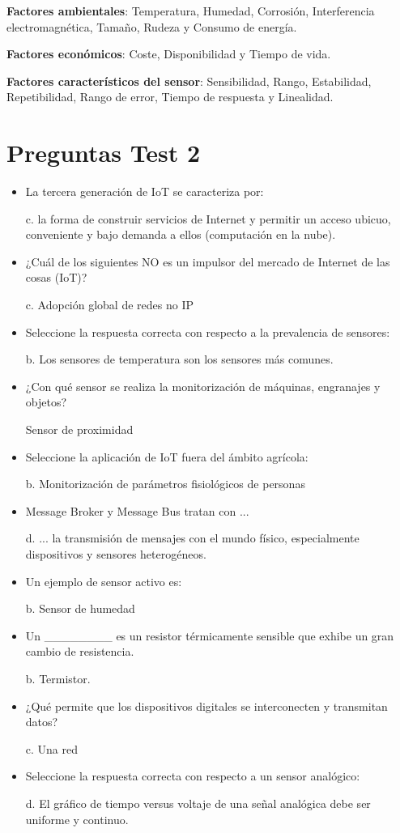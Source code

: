 \documentclass[12pt]{report} %
\begin{document}
\textbf{Factores ambientales}: Temperatura, Humedad, Corrosión,
Interferencia electromagnética, Tamaño, Rudeza y Consumo de energía.

\textbf{Factores económicos}: Coste, Disponibilidad y Tiempo de vida.

\textbf{Factores característicos del sensor}: Sensibilidad, Rango,
Estabilidad, Repetibilidad, Rango de error, Tiempo de respuesta y
Linealidad.

\section{Preguntas Test 2}
\begin{itemize}
	\item La tercera generación de IoT se caracteriza por:
	
	c. la forma de construir servicios de Internet y permitir un acceso ubicuo, conveniente y bajo demanda a ellos (computación en la nube).

	\item ¿Cuál de los siguientes NO es un impulsor del mercado de Internet de las cosas (IoT)?
	
	c. Adopción global de redes no IP 

	\item Seleccione la respuesta correcta con respecto a la prevalencia de sensores:

	b. Los sensores de temperatura son los sensores más comunes. 

	\item ¿Con qué sensor se realiza la monitorización de máquinas, engranajes y objetos?

	Sensor de proximidad

	\item Seleccione la aplicación de IoT fuera del ámbito agrícola:

	b. Monitorización de parámetros fisiológicos de personas 
	
	\item Message Broker y Message Bus tratan con ...
	
	d. ... la transmisión de mensajes con el mundo físico, especialmente dispositivos y sensores heterogéneos. 

	\item Un ejemplo de sensor activo es:

	b. Sensor de humedad 
	
	\item Un \_\_\_\_\_\_\_\_ es un resistor térmicamente sensible que exhibe un gran cambio de resistencia.

	b. Termistor.

	\item ¿Qué permite que los dispositivos digitales se interconecten y transmitan datos?

	c. Una red 

	\item Seleccione la respuesta correcta con respecto a un sensor analógico:

	d. El gráfico de tiempo versus voltaje de una señal analógica debe ser uniforme y continuo. 

\end{itemize}
\end{document}
